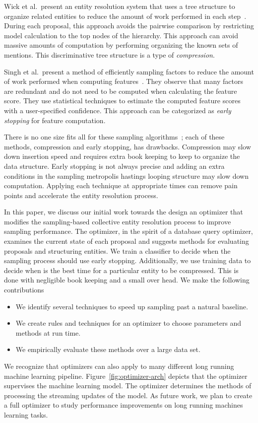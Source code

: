Wick et al.\ present an entity resolution system that uses a tree structure
to organize related entities to reduce the amount of work performed in each step~\cite{wick2013discriminative}.
During each proposal, this approach avoids the pairwise comparison by restricting model calculation to the top nodes of the hierarchy.
This approach can avoid massive amounts of computation by performing organizing the known sets of mentions.
This discriminative tree structure is a type of \textit{compression}.

Singh et al.\ present a method of efficiently sampling factors to reduce the
amount of work performed when computing features~\cite{singh2012monte}.
They observe that many factors are redundant and do not need to be computed when calculating the feature score.
They use statistical techniques to estimate the computed feature scores with a user-specified confidence.
This approach can be categorized as \textit{early stopping} for feature computation.

There is no one size fits all for these sampling algorithms~\cite{sculley2006compression};
each of these methods, compression and early stopping, has drawbacks.
Compression may slow down insertion speed and requires extra book keeping to keep to organize the data structure.
Early stopping is not always precise and adding an extra conditions in the sampling metropolis hastings looping structure may slow down computation.
Applying each technique at appropriate times can remove pain points and accelerate the entity resolution process.

In this paper, we discuss our initial work towards the design an optimizer that modifies the
sampling-based collective entity resolution process to improve sampling performance.
The optimizer, in the spirit of a database query optimizer, examines the
current state of each proposal and suggests methods for evaluating proposals and structuring entities.
We train a classifier to decide when the sampling process should use early stopping.
Additionally, we use training data to decide when is the best time for a particular entity to be compressed.
This is done with negligible book keeping and a small over head.
We make the following contributions
\begin{itemize}
\item We identify several techniques to speed up sampling past a natural baseline.
\item We create rules and techniques for an optimizer to choose parameters and methods at run time.
\item We empirically evaluate these methods over a large data set.
\end{itemize}
We recognize that optimizers can also apply to many different long running machine learning pipeline.
Figure~\ref{fig:optimizer-arch} depicts that the optimizer supervises the machine learning model.
The optimizer determines the methods of processing the streaming updates of the model. 
As future work, we plan to create a full optimizer to study performance improvements on long running machines learning tasks.


